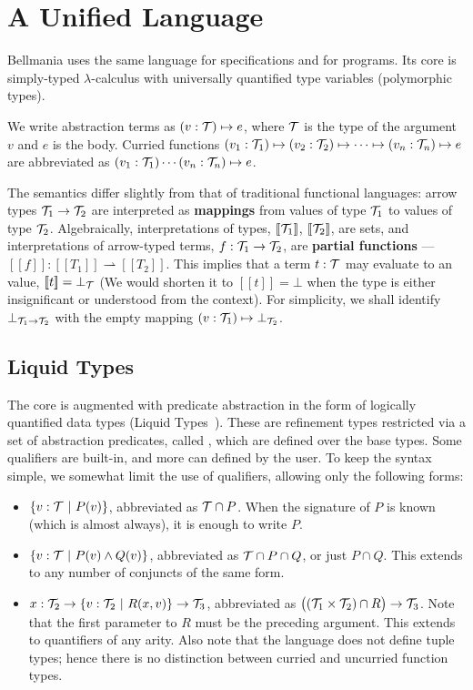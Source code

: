 \section{A Unified Language}

\newcommand\semp[1]{[\![{#1}]\!]}
\newcommand\fix{\operatorname{fix}}

Bellmania uses the same language for specifications and for programs.  Its core is simply-typed
$\lambda$-calculus with universally quantified type variables (polymorphic types).

We write abstraction terms as $(v:\mathcal{T})\mapsto e$, where $\mathcal{T}$ is the type of the argument $v$ and $e$ is
the body. Curried functions $(v_1:\mathcal{T}_1)\mapsto (v_2:\mathcal{T}_2) \mapsto \cdots \mapsto (v_n:\mathcal{T}_n) \mapsto e$ are abbreviated 
as $(v_1:\mathcal{T}_1)\cdots(v_n:\mathcal{T}_n)\mapsto e$.

The semantics differ slightly from that of traditional functional languages: arrow types $\mathcal{T}_1\to\mathcal{T}_2$
are interpreted as {\bf mappings} from values of type $\mathcal{T}_1$ to values of type $\mathcal{T}_2$. Algebraically,
interpretations of types, $\semp{\T_1}$, $\semp{\T_2}$, are sets, and interpretations of arrow-typed terms,
$f : \mathcal{T}_1\to\mathcal{T}_2$, are {\bf partial functions} --- $\semp{f} : \semp{T_1}\rightharpoonup\semp{T_2}$.
This implies that a term $t : \mathcal{T}$ may evaluate to an  value, $\semp{t}=\bot_\T$
(We would shorten it to $\semp{t}=\bot$ when the type is either insignificant or understood from the context).
For simplicity, we shall identify $\bot_{\mathcal{T}_1\to\mathcal{T}_2}$ with the empty mapping $(v:\mathcal{T}_1)\mapsto\bot_{\mathcal{T}_2}$.

\subsection{Liquid Types}

The core is augmented with predicate abstraction in the form of logically quantified data types 
(Liquid Types~\cite{PLDI08/Rondon}). These are refinement types restricted via a set of abstraction predicates,
called , which are defined over the base types.
Some qualifiers are built-in, and more can defined by the user. To keep the syntax simple, we somewhat
limit the use of qualifiers, allowing only the following forms:

\begin{itemize}
  \item $\{v:\mathcal{T} ~|~ P(v)\}$, abbreviated as $\mathcal{T}\cap P$. When the signature of $P$ is known (which is
  almost always), it is enough to write $P$.
  \item $\{v:\mathcal{T} ~|~ P(v)\land Q(v)\}$, abbreviated as $\mathcal{T}\cap P\cap Q$, or just $P\cap Q$. This extends
  to any number of conjuncts of the same form.
  \item $x : \mathcal{T}_2 \to \{v:\mathcal{T}_2 ~|~ R(x,v)\} \to \mathcal{T}_3$, abbreviated as $\big((\mathcal{T}_1\times\mathcal{T}_2)\cap R\big)\to\mathcal{T}_3$.
  Note that the first parameter to $R$ must be the preceding argument. This extends to quantifiers of
  any arity. Also note that the language does not define tuple types; hence there is no distinction
  between curried and uncurried function types.
\end{itemize}

